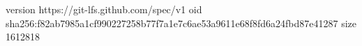 version https://git-lfs.github.com/spec/v1
oid sha256:f82ab7985a1cf990227258b77f7a1e7c6ae53a9611e68f8fd6a24fbd87e41287
size 1612818
